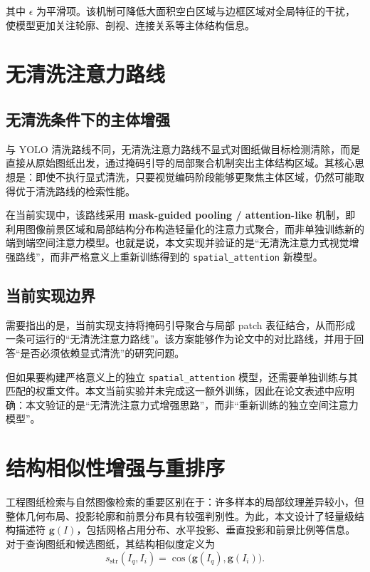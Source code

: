 其中 $\epsilon$ 为平滑项。该机制可降低大面积空白区域与边框区域对全局特征的干扰，使模型更加关注轮廓、剖视、连接关系等主体结构信息。

\section{无清洗注意力路线}

\subsection{无清洗条件下的主体增强}

与 YOLO 清洗路线不同，无清洗注意力路线不显式对图纸做目标检测清除，而是直接从原始图纸出发，通过掩码引导的局部聚合机制突出主体结构区域。其核心思想是：即使不执行显式清洗，只要视觉编码阶段能够更聚焦主体区域，仍然可能取得优于清洗路线的检索性能。

在当前实现中，该路线采用 \textbf{mask-guided pooling / attention-like} 机制，即利用图像前景区域和局部结构分布构造轻量化的注意力式聚合，而非单独训练新的端到端空间注意力模型。也就是说，本文实现并验证的是“无清洗注意力式视觉增强路线”，而非严格意义上重新训练得到的 \texttt{spatial\_attention} 新模型。

\subsection{当前实现边界}

需要指出的是，当前实现支持将掩码引导聚合与局部 patch 表征结合，从而形成一条可运行的“无清洗注意力路线”。该方案能够作为论文中的对比路线，并用于回答“是否必须依赖显式清洗”的研究问题。

但如果要构建严格意义上的独立 \texttt{spatial\_attention} 模型，还需要单独训练与其匹配的权重文件。本文当前实验并未完成这一额外训练，因此在论文表述中应明确：本文验证的是“无清洗注意力式增强思路”，而非“重新训练的独立空间注意力模型”。

\section{结构相似性增强与重排序}

工程图纸检索与自然图像检索的重要区别在于：许多样本的局部纹理差异较小，但整体几何布局、投影轮廓和前景分布具有较强判别性。为此，本文设计了轻量级结构描述符 $\bm{g}(I)$，包括网格占用分布、水平投影、垂直投影和前景比例等信息。对于查询图纸和候选图纸，其结构相似度定义为
\begin{equation}
  s_{\text{str}}(I_q,I_i)=\operatorname{cos}\bigl(\bm{g}(I_q),\bm{g}(I_i)\bigr).
  \label{eq:structure-score-new}
\end{equation}


